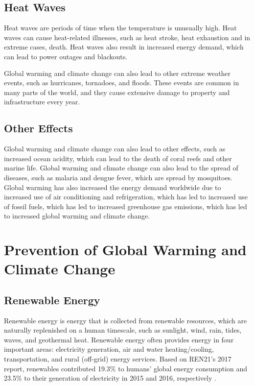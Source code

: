 \documentclass{article}
\begin{document}
\subsection{Heat Waves}
Heat waves are periods of time when the temperature is unusually high. Heat
waves can cause heat-related illnesses, such as heat stroke, heat exhaustion
and in extreme cases, death. Heat waves also result in increased energy demand,
which can lead to power outages and blackouts.

Global warming and climate change can also lead to other extreme weather
events, such as hurricanes, tornadoes, and floods. These events are common in
many parts of the world, and they cause extensive damage to property and
infrastructure every year.

\subsection{Other Effects}
Global warming and climate change can also lead to other effects, such as
increased ocean acidity, which can lead to the death of coral reefs and other
marine life. Global warming and climate change can also lead to the spread of
diseases, such as malaria and dengue fever, which are spread by mosquitoes.
Global warming has also increased the energy demand worldwide due to increased
use of air conditioning and refrigeration, which has led to increased use of
fossil fuels, which has led to increased greenhouse gas emissions, which has
led to increased global warming and climate change.

\section{Prevention of Global Warming and Climate Change}
\subsection{Renewable Energy}
Renewable energy is energy that is collected from renewable resources, which
are naturally replenished on a human timescale, such as sunlight, wind, rain,
tides, waves, and geothermal heat. Renewable energy often provides energy in
four important areas: electricity generation, air and water heating/cooling,
transportation, and rural (off-grid) energy services. Based on REN21's 2017
report, renewables contributed 19.3\% to humans' global energy consumption and
23.5\% to their generation of electricity in 2015 and 2016, respectively
\cite{REN21}.
\end{document}
